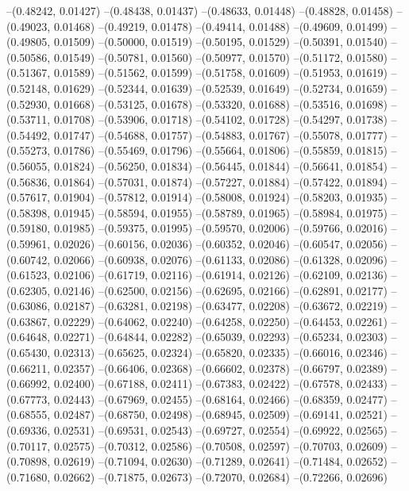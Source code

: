 --(0.48242, 0.01427)
--(0.48438, 0.01437)
--(0.48633, 0.01448)
--(0.48828, 0.01458)
--(0.49023, 0.01468)
--(0.49219, 0.01478)
--(0.49414, 0.01488)
--(0.49609, 0.01499)
--(0.49805, 0.01509)
--(0.50000, 0.01519)
--(0.50195, 0.01529)
--(0.50391, 0.01540)
--(0.50586, 0.01549)
--(0.50781, 0.01560)
--(0.50977, 0.01570)
--(0.51172, 0.01580)
--(0.51367, 0.01589)
--(0.51562, 0.01599)
--(0.51758, 0.01609)
--(0.51953, 0.01619)
--(0.52148, 0.01629)
--(0.52344, 0.01639)
--(0.52539, 0.01649)
--(0.52734, 0.01659)
--(0.52930, 0.01668)
--(0.53125, 0.01678)
--(0.53320, 0.01688)
--(0.53516, 0.01698)
--(0.53711, 0.01708)
--(0.53906, 0.01718)
--(0.54102, 0.01728)
--(0.54297, 0.01738)
--(0.54492, 0.01747)
--(0.54688, 0.01757)
--(0.54883, 0.01767)
--(0.55078, 0.01777)
--(0.55273, 0.01786)
--(0.55469, 0.01796)
--(0.55664, 0.01806)
--(0.55859, 0.01815)
--(0.56055, 0.01824)
--(0.56250, 0.01834)
--(0.56445, 0.01844)
--(0.56641, 0.01854)
--(0.56836, 0.01864)
--(0.57031, 0.01874)
--(0.57227, 0.01884)
--(0.57422, 0.01894)
--(0.57617, 0.01904)
--(0.57812, 0.01914)
--(0.58008, 0.01924)
--(0.58203, 0.01935)
--(0.58398, 0.01945)
--(0.58594, 0.01955)
--(0.58789, 0.01965)
--(0.58984, 0.01975)
--(0.59180, 0.01985)
--(0.59375, 0.01995)
--(0.59570, 0.02006)
--(0.59766, 0.02016)
--(0.59961, 0.02026)
--(0.60156, 0.02036)
--(0.60352, 0.02046)
--(0.60547, 0.02056)
--(0.60742, 0.02066)
--(0.60938, 0.02076)
--(0.61133, 0.02086)
--(0.61328, 0.02096)
--(0.61523, 0.02106)
--(0.61719, 0.02116)
--(0.61914, 0.02126)
--(0.62109, 0.02136)
--(0.62305, 0.02146)
--(0.62500, 0.02156)
--(0.62695, 0.02166)
--(0.62891, 0.02177)
--(0.63086, 0.02187)
--(0.63281, 0.02198)
--(0.63477, 0.02208)
--(0.63672, 0.02219)
--(0.63867, 0.02229)
--(0.64062, 0.02240)
--(0.64258, 0.02250)
--(0.64453, 0.02261)
--(0.64648, 0.02271)
--(0.64844, 0.02282)
--(0.65039, 0.02293)
--(0.65234, 0.02303)
--(0.65430, 0.02313)
--(0.65625, 0.02324)
--(0.65820, 0.02335)
--(0.66016, 0.02346)
--(0.66211, 0.02357)
--(0.66406, 0.02368)
--(0.66602, 0.02378)
--(0.66797, 0.02389)
--(0.66992, 0.02400)
--(0.67188, 0.02411)
--(0.67383, 0.02422)
--(0.67578, 0.02433)
--(0.67773, 0.02443)
--(0.67969, 0.02455)
--(0.68164, 0.02466)
--(0.68359, 0.02477)
--(0.68555, 0.02487)
--(0.68750, 0.02498)
--(0.68945, 0.02509)
--(0.69141, 0.02521)
--(0.69336, 0.02531)
--(0.69531, 0.02543)
--(0.69727, 0.02554)
--(0.69922, 0.02565)
--(0.70117, 0.02575)
--(0.70312, 0.02586)
--(0.70508, 0.02597)
--(0.70703, 0.02609)
--(0.70898, 0.02619)
--(0.71094, 0.02630)
--(0.71289, 0.02641)
--(0.71484, 0.02652)
--(0.71680, 0.02662)
--(0.71875, 0.02673)
--(0.72070, 0.02684)
--(0.72266, 0.02696)
